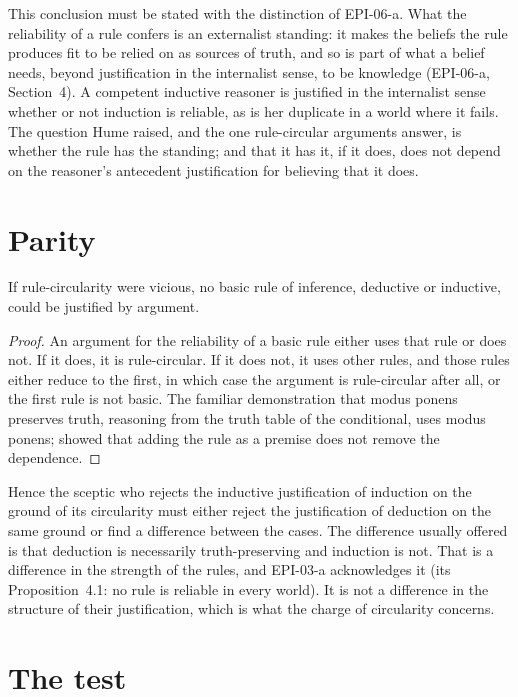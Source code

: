 \documentclass{situationist-preprint}
\begin{document}
This conclusion must be stated with the distinction of EPI-06-a. What the reliability of a rule confers is an externalist standing: it makes the beliefs the rule produces fit to be relied on as sources of truth, and so is part of what a belief needs, beyond justification in the internalist sense, to be knowledge (EPI-06-a, Section~4). A competent inductive reasoner is justified in the internalist sense whether or not induction is reliable, as is her duplicate in a world where it fails. The question Hume raised, and the one rule-circular arguments answer, is whether the rule has the standing; and that it has it, if it does, does not depend on the reasoner's antecedent justification for believing that it does.

\section{Parity}

\begin{proposition}\label{p:parity}
If rule-circularity were vicious, no basic rule of inference, deductive or inductive, could be justified by argument.
\end{proposition}

\begin{proof}
An argument for the reliability of a basic rule either uses that rule or does not. If it does, it is rule-circular. If it does not, it uses other rules, and those rules either reduce to the first, in which case the argument is rule-circular after all, or the first rule is not basic. The familiar demonstration that modus ponens preserves truth, reasoning from the truth table of the conditional, uses modus ponens; \citet{Carroll1895} showed that adding the rule as a premise does not remove the dependence.
\end{proof}

Hence the sceptic who rejects the inductive justification of induction on the ground of its circularity must either reject the justification of deduction on the same ground or find a difference between the cases. The difference usually offered is that deduction is necessarily truth-preserving and induction is not. That is a difference in the strength of the rules, and EPI-03-a acknowledges it (its Proposition~4.1: no rule is reliable in every world). It is not a difference in the structure of their justification, which is what the charge of circularity concerns.

\section{The test}
\end{document}
